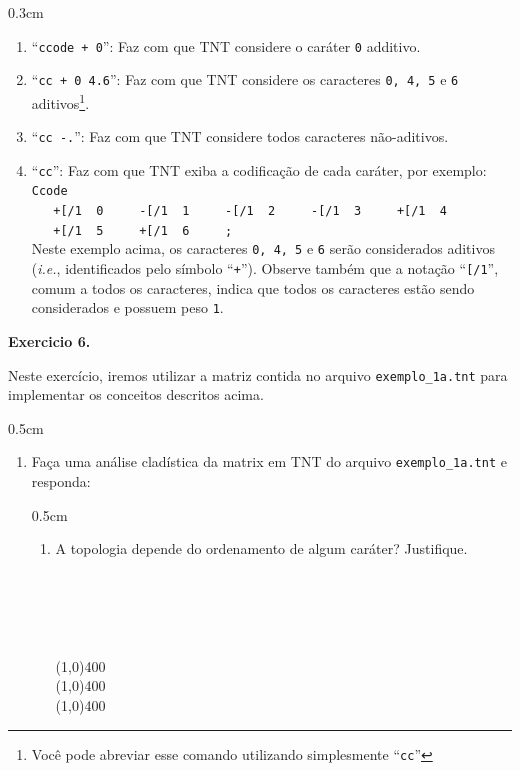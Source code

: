 \begin{refsection}
\begin {myindentpar}{0.3cm}
\begin{enumerate}[\itshape i.]
	\item{``\texttt{ccode + 0}''}: Faz com que TNT considere o caráter \texttt{0} additivo.\\
	\item{``\texttt{cc + 0 4.6}''}: Faz com que TNT considere os caracteres \texttt{0, 4, 5} e \texttt{6} aditivos\footnote{Você pode abreviar esse comando utilizando simplesmente ``\texttt{cc}''}.\\
	\item{``\texttt{cc -.}''}: Faz com que TNT considere todos caracteres não-aditivos.\\
	\item{``\texttt{cc}''}: Faz com que TNT exiba a codificação de cada caráter, por exemplo:\\
\texttt{Ccode~~}\\
\texttt{~~~+[/1~~0~~~~~-[/1~~1~~~~~-[/1~~2~~~~~-[/1~~3~~~~~+[/1~~4~~~~~}\\
\texttt{~~~+[/1~~5~~~~~+[/1~~6~~~~~;}\\

Neste exemplo acima, os caracteres \texttt{0, 4, 5} e \texttt{6} serão considerados aditivos (\textit{i.e.}, identificados pelo símbolo ``\texttt{+}''). Observe também que a notação ``\texttt{[/1}'', comum a todos os caracteres, indica que todos os caracteres estão sendo considerados e possuem peso \texttt{1}.\\

\end{enumerate}
\end{myindentpar}


\begin{blackBlock}{\textbf{Exercicio 6.}}\label{tut6:ex:6.1}

Neste exercício, iremos utilizar a matriz contida no arquivo \texttt{exemplo\_1a.tnt} para implementar os conceitos descritos acima.

\end{blackBlock}


\begin {myindentpar}{0.5cm}
\begin{enumerate}[\itshape i.]
	\item{Faça uma análise cladística da matrix em TNT do arquivo \texttt{exemplo\_1a.tnt} e responda:}
		\begin {myindentpar}{0.5cm}
		\begin{enumerate}[\itshape a.]
		\item{A topologia depende do ordenamento de algum caráter? Justifique.}
\\
\\
\\
\\
\\
\\
		\line(1,0){400}\\
		\line(1,0){400}\\
		\line(1,0){400}\\


\end{enumerate}
\end{myindentpar}
\end{enumerate}
\end{myindentpar}
\end{refsection}
